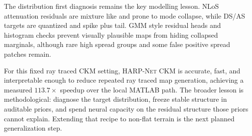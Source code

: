 \documentclass[journal]{IEEEtran}
\begin{document}
The distribution first diagnosis remains the key modelling lesson. NLoS
attenuation residuals are mixture like and prone to mode collapse, while DS/AS
targets are quantized and spike plus tail. GMM style residual heads and
histogram checks prevent visually plausible maps from hiding collapsed
marginals, although rare high spread groups and some false positive spread
patches remain.

For this fixed ray traced CKM setting, \textsc{HARP-Net CKM} is accurate, fast,
and interpretable enough to reduce repeated ray traced map generation, achieving
a measured \(113.7\times\) speedup over the local MATLAB path. The broader
lesson is methodological: diagnose the target distribution, freeze stable
structure in auditable priors, and spend neural capacity on the residual
structure those priors cannot explain. Extending that recipe to non-flat
terrain is the next planned generalization step.



\end{document}
